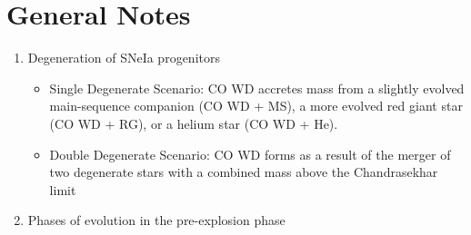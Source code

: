 \documentclass[11pt]{article}
\begin{document}
\section{General Notes}
	\begin{enumerate}
		\item Degeneration of SNeIa progenitors
			\begin{itemize}
				\item Single Degenerate Scenario: CO WD accretes mass from a slightly evolved main-sequence companion (CO WD + MS), a more evolved red giant star (CO WD + RG), or a helium star (CO WD + He).
				\item Double Degenerate Scenario: CO WD forms as a result of the merger of two degenerate stars with a combined mass above the Chandrasekhar limit
			\end{itemize}
		\item Phases of evolution in the pre-explosion phase
		

\end{enumerate}
\end{document}

